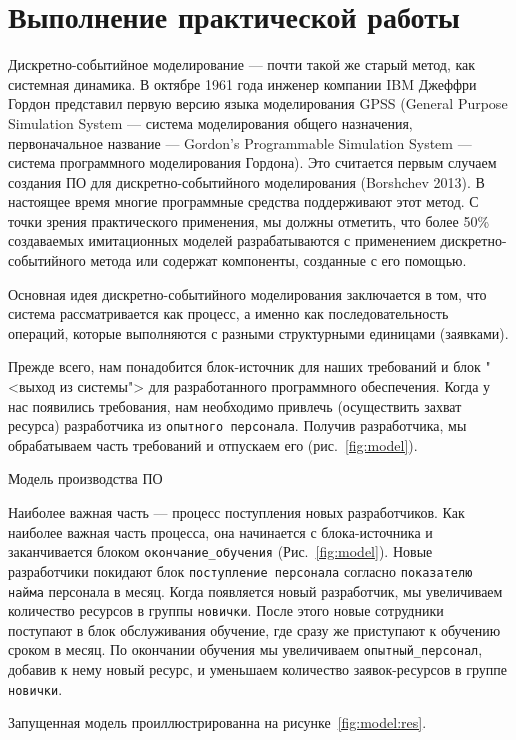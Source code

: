 \graphicspath{{./twelfth/img}} %

\section*{Выполнение практической работы}
Дискретно-событийное моделирование --- почти такой же старый метод,
как системная динамика. В октябре 1961 года инженер компании IBM
Джеффри Гордон представил первую версию языка моделирования GPSS
(General Purpose Simulation System --- система моделирования общего
назначения, первоначальное название --- Gordon’s Programmable Simulation
System --- система программного моделирования Гордона). Это считается
первым случаем создания ПО для дискретно-событийного моделирования
(Borshchev 2013). В настоящее время многие программные средства
поддерживают этот метод. С точки зрения практического применения, мы
должны отметить, что более 50\% создаваемых имитационных моделей
разрабатываются с применением дискретно-событийного метода или
содержат компоненты, созданные с его помощью.\par
Основная идея дискретно-событийного моделирования заключается в том,
что система рассматривается как процесс, а именно как последовательность
операций, которые выполняются с разными структурными единицами
(заявками).\par
Прежде всего, нам
понадобится блок-источник для наших требований и блок "<выход из
системы"> для разработанного программного обеспечения. Когда у нас
появились требования, нам необходимо привлечь (осуществить захват
ресурса) разработчика из \texttt{опытного персонала}. Получив разработчика,
мы обрабатываем часть требований и отпускаем его (рис.~\ref{fig:model}).

\begin{image}
	\caption{Модель производства ПО}
	\label{fig:model}
\end{image}

Наиболее важная часть --- процесс поступления новых
разработчиков. Как наиболее важная часть процесса, она начинается с
блока-источника и заканчивается блоком \texttt{окончание\_обучения}
(Рис.~\ref{fig:model}).
Новые разработчики покидают блок \texttt{поступление персонала} согласно
\texttt{показателю найма} персонала в месяц. Когда появляется новый
разработчик, мы увеличиваем количество ресурсов в группы \texttt{новички}.
После этого новые сотрудники поступают в блок обслуживания обучение,
где сразу же приступают к обучению сроком в месяц. По окончании обучения
мы увеличиваем \texttt{опытный\_персонал}, добавив к нему новый ресурс, и
уменьшаем количество заявок-ресурсов в группе \texttt{новички}.\par
Запущенная модель проиллюстрированна на рисунке~\ref{fig:model:res}.

